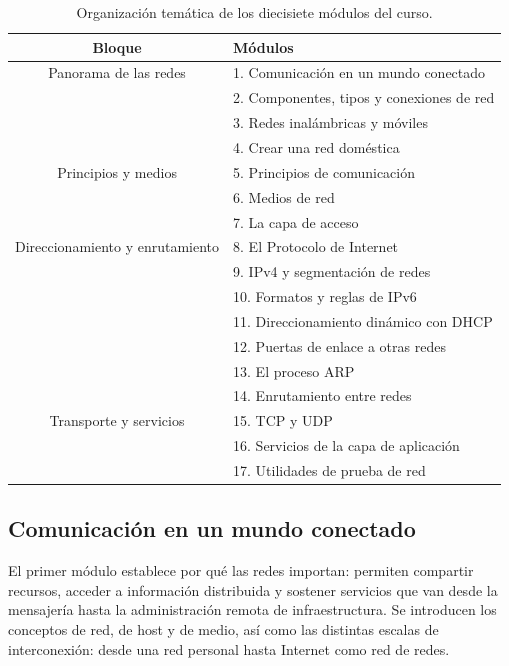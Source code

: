 \documentclass[11pt,a4paper]{article}
\begin{document}
\begin{table}[htbp]
  \centering
  \small
  \begin{tabular}{@{}cl@{}}
    \toprule
    \textbf{Bloque} & \textbf{Módulos} \\ \midrule
    Panorama de las redes & 1. Comunicación en un mundo conectado \\
                          & 2. Componentes, tipos y conexiones de red \\
                          & 3. Redes inalámbricas y móviles \\
                          & 4. Crear una red doméstica \\ \addlinespace
    Principios y medios   & 5. Principios de comunicación \\
                          & 6. Medios de red \\
                          & 7. La capa de acceso \\ \addlinespace
    Direccionamiento y enrutamiento
                          & 8. El Protocolo de Internet \\
                          & 9. IPv4 y segmentación de redes \\
                          & 10. Formatos y reglas de IPv6 \\
                          & 11. Direccionamiento dinámico con DHCP \\
                          & 12. Puertas de enlace a otras redes \\
                          & 13. El proceso ARP \\
                          & 14. Enrutamiento entre redes \\ \addlinespace
    Transporte y servicios
                          & 15. TCP y UDP \\
                          & 16. Servicios de la capa de aplicación \\
                          & 17. Utilidades de prueba de red \\ \bottomrule
  \end{tabular}
  \caption{Organización temática de los diecisiete módulos del curso.}
  \label{tab:estructura}
\end{table}

\subsection{Comunicación en un mundo conectado}

El primer módulo establece por qué las redes importan: permiten compartir
recursos, acceder a información distribuida y sostener servicios que van desde
la mensajería hasta la administración remota de infraestructura. Se introducen
los conceptos de red, de host y de medio, así como las distintas escalas de
interconexión: desde una red personal hasta Internet como red de redes.
\end{document}
